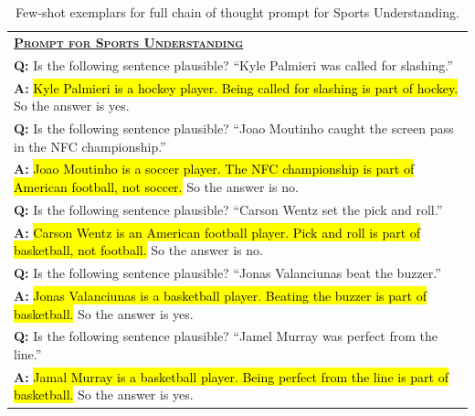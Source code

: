\documentclass[]{article}
\theoremstyle{plain}
\theoremstyle{definition}
\theoremstyle{remark}
\begin{document}
\begin{table}[H]
    \centering
    \small
    \caption{
    Few-shot exemplars for full chain of thought prompt for Sports Understanding.
    }
    \begin{tabular}{p{\linewidth}}
        \toprule
        \underline{\textbf{\textsc{Prompt for Sports Understanding}}} \\
        \vspace{-2mm}
        \textbf{Q:} Is the following sentence plausible? ``Kyle Palmieri was called for slashing.'' \\
        \vspace{-1mm}
        \textbf{A:} \hl{Kyle Palmieri is a hockey player. Being called for slashing is part of hockey.} So the answer is yes. \\
        \vspace{0mm}
        \textbf{Q:} Is the following sentence plausible? ``Joao Moutinho caught the screen pass in the NFC championship.'' \\
        \vspace{-1mm}
        \textbf{A:} \hl{Joao Moutinho is a soccer player. The NFC championship is part of American football, not soccer.} So the answer is no. \\
        \vspace{0mm}
        \textbf{Q:} Is the following sentence plausible? ``Carson Wentz set the pick and roll.'' \\
        \vspace{-1mm}
        \textbf{A:} \hl{Carson Wentz is an American football player. Pick and roll is part of basketball, not football.} So the answer is no. \\
        \vspace{0mm}
        \textbf{Q:} Is the following sentence plausible? ``Jonas Valanciunas beat the buzzer.'' \\
        \vspace{-1mm}
        \textbf{A:} \hl{Jonas Valanciunas is a basketball player. Beating the buzzer is part of basketball.} So the answer is yes. \\
        \vspace{0mm}
        \textbf{Q:} Is the following sentence plausible? ``Jamel Murray was perfect from the line.'' \\
        \vspace{-1mm}
        \textbf{A:} \hl{Jamal Murray is a basketball player. Being perfect from the line is part of basketball.}  So the answer is yes. \\

\end{tabular}
\end{table}
\end{document}

